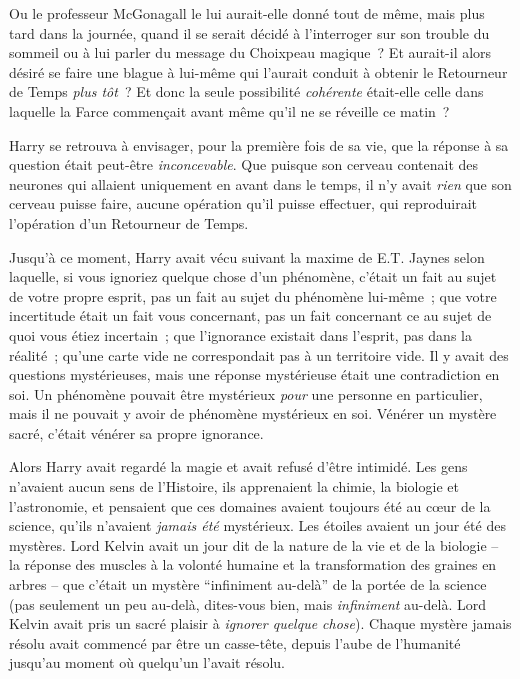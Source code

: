 Ou le professeur McGonagall le lui aurait-elle donné tout de même, mais plus tard dans la journée, quand il se serait décidé à l'interroger sur son trouble du sommeil ou à lui parler du message du Choixpeau magique~? Et aurait-il alors désiré se faire une blague à lui-même qui l'aurait conduit à obtenir le Retourneur de Temps \emph{plus tôt}~? Et donc la seule possibilité \emph{cohérente} était-elle celle dans laquelle la Farce commençait avant même qu'il ne se réveille ce matin~?

Harry se retrouva à envisager, pour la première fois de sa vie, que la réponse à sa question était peut-être \emph{inconcevable}. Que puisque son cerveau contenait des neurones qui allaient uniquement en avant dans le temps, il n'y avait \emph{rien} que son cerveau puisse faire, aucune opération qu'il puisse effectuer, qui reproduirait l'opération d'un Retourneur de Temps.

Jusqu'à ce moment, Harry avait vécu suivant la maxime de E.T. Jaynes selon laquelle, si vous ignoriez quelque chose d'un phénomène, c'était un fait au sujet de votre propre esprit, pas un fait au sujet du phénomène lui-même~; que votre incertitude était un fait vous concernant, pas un fait concernant ce au sujet de quoi vous étiez incertain~; que l'ignorance existait dans l'esprit, pas dans la réalité~; qu'une carte vide ne correspondait pas à un territoire vide. Il y avait des questions mystérieuses, mais une réponse mystérieuse était une contradiction en soi. Un phénomène pouvait être mystérieux \emph{pour} une personne en particulier, mais il ne pouvait y avoir de phénomène mystérieux en soi. Vénérer un mystère sacré, c'était vénérer sa propre ignorance.

Alors Harry avait regardé la magie et avait refusé d'être intimidé. Les gens n'avaient aucun sens de l'Histoire, ils apprenaient la chimie, la biologie et l'astronomie, et pensaient que ces domaines avaient toujours été au cœur de la science, qu'ils n'avaient \emph{jamais été} mystérieux. Les étoiles avaient un jour été des mystères. Lord Kelvin avait un jour dit de la nature de la vie et de la biologie -- la réponse des muscles à la volonté humaine et la transformation des graines en arbres -- que c'était un mystère “infiniment au-delà” de la portée de la science (pas seulement un peu au-delà, dites-vous bien, mais \emph{infiniment} au-delà. Lord Kelvin avait pris un sacré plaisir à \emph{ignorer quelque chose}). Chaque mystère jamais résolu avait commencé par être un casse-tête, depuis l'aube de l'humanité jusqu'au moment où quelqu'un l'avait résolu.

